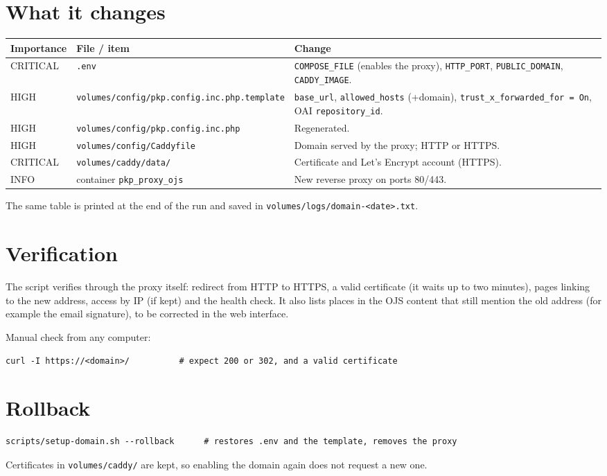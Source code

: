 \documentclass[11pt,a4paper]{report}
\newcommand{\code}[1]{\texttt{\small #1}}
\newcommand{\file}[1]{\texttt{\small #1}}
\begin{document}
\section{What it changes}
\begin{tabularx}{\linewidth}{@{}lP{5.6cm}L@{}}
\toprule
\textbf{Importance} & \textbf{File / item} & \textbf{Change} \\
\midrule
CRITICAL & \file{.env} & \code{COMPOSE\_FILE} (enables the proxy), \code{HTTP\_PORT}, \code{PUBLIC\_DOMAIN}, \code{CADDY\_IMAGE}. \\
HIGH     & \file{volumes/config/\allowbreak pkp.config.inc.php.template} & \code{base\_url}, \code{allowed\_hosts} (+domain), \code{trust\_x\_forwarded\_for = On}, OAI \code{repository\_id}. \\
HIGH     & \file{volumes/config/\allowbreak pkp.config.inc.php} & Regenerated. \\
HIGH     & \file{volumes/config/Caddyfile} & Domain served by the proxy; HTTP or HTTPS. \\
CRITICAL & \file{volumes/caddy/data/} & Certificate and Let's Encrypt account (HTTPS). \\
INFO     & container \code{pkp\_proxy\_ojs} & New reverse proxy on ports 80/443. \\
\bottomrule
\end{tabularx}
The same table is printed at the end of the run and saved in \file{volumes/logs/domain-<date>.txt}.

\section{Verification}
The script verifies through the proxy itself: redirect from HTTP to HTTPS, a valid certificate
(it waits up to two minutes), pages linking to the new address, access by IP (if kept) and the
health check. It also lists places in the OJS content that still mention the old address (for
example the email signature), to be corrected in the web interface.

Manual check from any computer:
\begin{lstlisting}
curl -I https://<domain>/          # expect 200 or 302, and a valid certificate
\end{lstlisting}

\section{Rollback}
\begin{lstlisting}
scripts/setup-domain.sh --rollback      # restores .env and the template, removes the proxy
\end{lstlisting}
Certificates in \file{volumes/caddy/} are kept, so enabling the domain again does not request a
new one.
\end{document}

